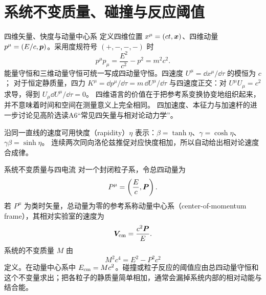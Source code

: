 \section{系统不变质量、碰撞与反应阈值}
\begingroup{}\begin{starread}{四维矢量、快度与动量中心系}
定义四维位置 $x^\mu=(ct,\bm{x})$、四维动量 $p^\mu=(E/c,\bm{p})$。采用度规符号
$(+,-,-,-)$ 时
\[
 p^\mu p_\mu=\frac{E^2}{c^2}-p^2=m^2c^2.
\]
能量守恒和三维动量守恒可统一写成四动量守恒。四速度 $U^\mu=\dd x^\mu/\dd\tau$ 的模恒为 $c$；
对于恒定静质量，四力 $K^\mu=\dd p^\mu/\dd\tau=m\,\dd U^\mu/\dd\tau$ 与四速度正交：对 $U^\mu U_\mu=c^2$ 求导，得到 $U_\mu\dd U^\mu/\dd\tau=0$。
四维语言的价值在于把参考系变换协变地组织起来，并不意味着时间和空间在测量意义上完全相同。
四加速度、本征力与加速杆的进一步讨论见高阶选读A6“常见四矢量与相对论动力学”。

沿同一直线的速度可用快度（rapidity）$\eta$ 表示：$\beta=\tanh\eta$、$\gamma=\cosh\eta$、$\gamma\beta=\sinh\eta$。
连续两次同向洛伦兹推促对应快度相加，所以自动给出相对论速度合成律。

\end{starread}\par{}
\begin{starread}{系统不变质量与四电流}
对一个封闭粒子系，令总四动量为
\[
 P^\mu=\left(\frac{E}{c},\bm{P}\right).
\]
若 $P^\mu$ 为类时矢量，总动量为零的参考系称动量中心系（center-of-momentum frame），其相对实验室的速度为
\[
 \bm{V}_{\rm cm}=\frac{c^2\bm{P}}{E}.
\]
系统的不变质量 $M$ 由
\[
 M^2c^4=E^2-P^2c^2
\]
定义。在动量中心系中 $E_{\rm cm}=Mc^2$。碰撞或粒子反应的阈值应由总四动量守恒和这个不变量求出；把各粒子的静质量简单相加，通常会漏掉系统内部的相对动能与结合能。



\end{starread}\endgroup
